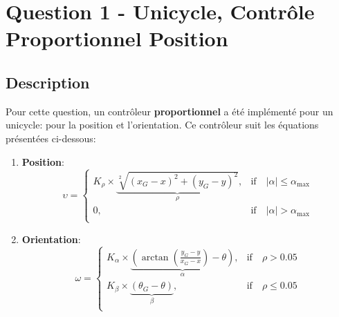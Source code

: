 \documentclass[../CSC_5RO16_TA_TP3.tex]{subfiles}
\begin{document}
\section{Question 1 - Unicycle, Contrôle Proportionnel Position}

\subsection{Description}
\noindent Pour cette question, un contrôleur \textbf{proportionnel} a été implémenté pour un unicycle: pour la position et l'orientation. Ce contrôleur suit les équations présentées ci-dessous:
\begin{enumerate}
    \item \textbf{Position}:
    \begin{equation}
        \upsilon = 
        \begin{cases}
            K_{\rho} \times \underbrace{\sqrt[2]{(x_{G} - x)^2 + (y_{G} - y)^2}}_{\rho}, & \text{if}\quad | \alpha | \le \alpha_{\text{max}}\\
            0, & \text{if}\quad | \alpha | > \alpha_{\text{max}}\\
        \end{cases}
    \end{equation}
    \item \textbf{Orientation}:
    \begin{equation}
        \omega =
        \begin{cases}
            K_{\alpha} \times \underbrace{\left(\arctan\left(\frac{y_{G} - y}{x_{G} - x}\right) - \theta\right)}_{\alpha}, & \text{if}\quad \rho > 0.05\\
            K_{\beta} \times \underbrace{\left(\theta_{G} - \theta\right)}_{\beta}, & \text{if}\quad \rho \le 0.05\\
        \end{cases}
    \end{equation}
\end{enumerate}
\end{document}
